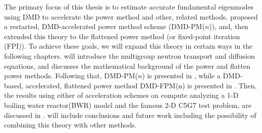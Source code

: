 The primary focus of this thesis is to estimate accurate fundamental eigenmodes using DMD to accelerate the power method and other, related methods.
\citet{roberts2019acceleration} proposed a restarted, DMD-accelerated power method scheme (DMD-PM($n$)), and, \citet{xu_acceleration} then extended this theory to the flattened power method (or fixed-point iteration (FPI)).
To achieve these goals, we will expand this theory in certain ways in the following chapters.
 will introduce the multigroup neutron transport and diffusion equations, and  discusses the mathematical background of the power and flatten power methods.
Following that, DMD-PM($n$) is presented in , while a DMD-based, accelerated, flattened power
method DMD-FPM(n) is presented in .
Then, the results using either of acceleration schemes on compute analyzing a 1-D boiling water reactor(BWR) model and the famous 2-D C5G7 test problem, are discussed in .
 will include conclusions and future work including the possibility of combining this theory with other methods. 
